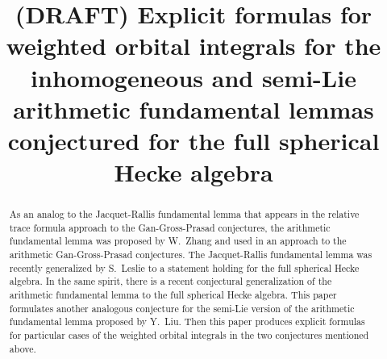 \documentclass[twoside]{mitthesis}
\begin{document}
\title{(DRAFT) Explicit formulas for weighted orbital integrals for the
  inhomogeneous and semi-Lie arithmetic fundamental lemmas
  conjectured for the full spherical Hecke algebra}



\maketitle

\begin{abstract}
  As an analog to the Jacquet-Rallis fundamental lemma that appears in the
  relative trace formula approach to the Gan-Gross-Prasad conjectures,
  the arithmetic fundamental lemma was proposed by W.\ Zhang and used in an approach
  to the arithmetic Gan-Gross-Prasad conjectures.
  The Jacquet-Rallis fundamental lemma was recently generalized by S.\ Leslie
  to a statement holding for the full spherical Hecke algebra.
  In the same spirit, there is a recent conjectural generalization
  of the arithmetic fundamental lemma to the full spherical Hecke algebra.
  This paper formulates another analogous conjecture for the semi-Lie version
  of the arithmetic fundamental lemma proposed by Y.\ Liu.
  Then this paper produces explicit formulas for particular cases
  of the weighted orbital integrals in the two conjectures mentioned above.
\end{abstract}

\onehalfspacing %



\tableofcontents
\listoffigures
\listoftables






















\printbibliography[title=References,heading=bibintoc]

\appendix

\end{document}
